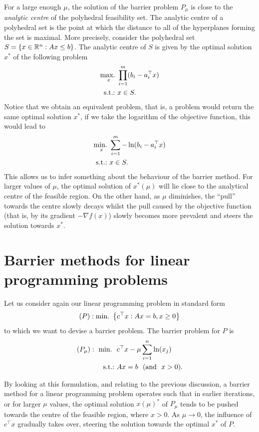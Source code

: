 For a large enough $\mu$, the solution of the barrier problem $P_\mu$ is close to the \emph{analytic centre} of the polyhedral feasibility set. The analytic centre of a polyhedral set is	the point at which the distance to all of the hyperplanes forming the set is maximal. More precisely, consider the polyhedral set $S = \left\{ x \in \mathbb{R}^n : Ax \leq b \right \} $. The analytic centre of $S$ is given by the optimal solution $x^*$ of the following problem
	\begin{align*}
		\mathop{\text{max.~}}_x & \prod_{i=1}^m (b_i - a_i ^\top x) \\
		\mathop{\text{s.t.:~}} & x \in S. 	
	\end{align*}
	Notice that we obtain an equivalent problem, that is, a problem would return the same optimal solution $x^*$, if we take the logarithm of the objective function, this would lead to
	\begin{align*}
		\mathop{\text{min.~}}_x & \sum_{i=1}^m -\ln(b_i - a_i ^\top x) \\
		\mathop{\text{s.t.:~}} & x \in S. 	
	\end{align*}
	This allows us to infer something about the behaviour of the barrier method. For larger values of $\mu$, the optimal solution of $x^*(\mu)$ will lie close to the analytical centre of the feasible region. On the other hand, as $\mu$ diminishes, the ``pull'' towards the centre slowly decays whilst the pull caused by the objective function (that is, by its gradient $-\nabla f(x)$) slowly becomes more prevalent and steers the solution towards $x^*$.


\section{Barrier methods for linear programming problems}

Let us consider again our linear programming problem in standard form 
	$$
	(P) : \mathop{\text{min.~}}\left\{ c^\top x : Ax = b, x \ge 0 \right \}
	$$ 
	to which we want to devise a barrier problem. The barrier problem for $P$ is
	\begin{align*}
		(P_\mu) :~ \mathop{\text{min.~}} \ &c^\top x  - \mu\sum_{i=1}^n \ln(x_j)\\
		\mathop{\text{s.t.:~}} &Ax = b \ \ ( \text{and} \ \ x > 0). 
	\end{align*}
	
By looking at this formulation, and relating to the previous discussion, a barrier method for a linear programming problem operates such that in earlier iterations, or for larger $\mu$ values, the optimal solution $x(\mu)^*$ of $P_\mu$ tends to be pushed towards the centre of the feasible region, where $x >0$. As $\mu \to 0$, the influence of $c^\top x$ gradually takes over, steering the solution towards the optimal $x^*$ of $P$. 

